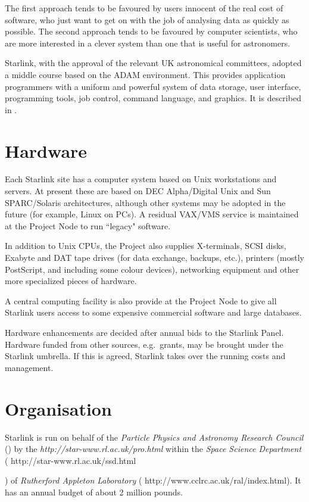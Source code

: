 {The first approach tends to be favoured by users innocent of the real cost
of software, who just want to get on with the job of analysing data as
quickly as possible.
The second approach tends to be favoured by computer scientists, who are more
interested in a clever system than one that is useful for astronomers.

Starlink, with the approval of the relevant UK astronomical committees,
adopted a middle course based on the ADAM environment.
This provides application programmers with a uniform and powerful system of
data storage, user interface, programming tools, job control, command language,
and graphics.
It is described in .

\newpage

\section*{Hardware}

Each Starlink site has a computer system based on Unix workstations and servers.
At present these are based on DEC Alpha/Digital Unix and Sun SPARC/Solaris
architectures,
although other systems may be adopted in the future (for example, Linux on PCs).
A residual VAX/VMS service is maintained at the Project Node to run ``legacy"
software.

In addition to Unix CPUs, the Project also supplies X-terminals, SCSI disks,
Exabyte and DAT tape drives (for data exchange, backups, etc.), printers
(mostly PostScript, and including some colour devices), networking equipment
and other more specialized pieces of hardware.

A central computing facility is also provide at the Project Node to 
give all Starlink users access to some expensive commercial software and large
databases.

Hardware enhancements are decided after annual bids to the Starlink Panel.
Hardware funded from other sources, e.g.\ grants, may be brought under the
Starlink umbrella.
If this is agreed, Starlink takes over the running costs and management.

\newpage

\section*{Organisation}

Starlink is run on behalf of the
{\em Particle Physics and Astronomy Research Council}\/ 
() 
by the
{\em {}
{http://star-www.rl.ac.uk/pro.html}}\/ 
within the
{\em Space Science Department}\/
(
{http://star-www.rl.ac.uk/ssd.html}})
of 
{\em Rutherford Appleton Laboratory}\/
(
{http://www.cclrc.ac.uk/ral/index.html}).
It has an annual budget of about 2 million pounds.


